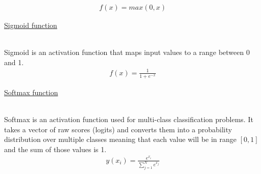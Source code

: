 \documentclass{article}
\begin{document}
    \begin{align*}
        f(x) = max(0, x)
    \end{align*}
    \begin{center}
    \end{center}
    \pagebreak

    \hypertarget{sigmoid}{\underline{Sigmoid function}} \\

    Sigmoid is an activation function that maps input values 
    to a range between 0 and 1. \\

    \begin{align*}
        f(x) = \frac{1}{1 + e^{-x}}
    \end{align*}

    \begin{center}    
    \end{center}
    \pagebreak

    \hypertarget{softmax}{\underline{Softmax function}} \\

    Softmax is an activation function used for multi-class classification
    problems. It takes a vector of raw scores (logits) and converts 
    them into a probability distribution over multiple classes meaning that 
    each value will be in range $[0, 1]$ and the sum of those values is 1.
    \begin{align*}
        y(x_{i}) = \frac{e^{x_{i}}}{\sum_{j=1}^{N} e^{x_{j}}}
    \end{align*}
    
\end{document}

